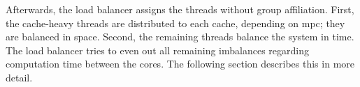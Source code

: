 Afterwards, the load balancer assigns the threads without group affiliation.
First, the cache-heavy threads are distributed to each cache, depending on
\gls{mpc}; they are balanced in space.
Second, the remaining threads balance the system in time.
The load balancer tries to even out all remaining imbalances regarding
computation time between the cores.
The following section describes this in more detail.

